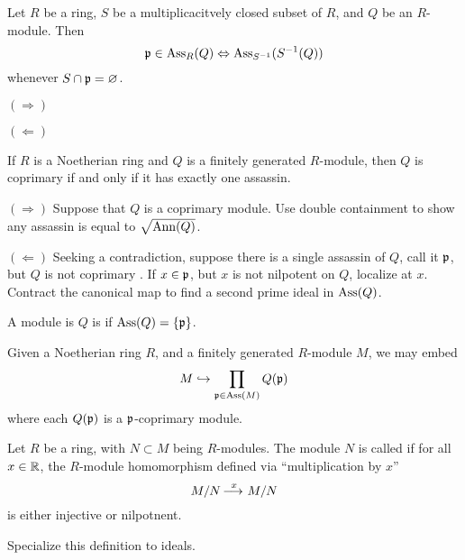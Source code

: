 \documentclass{ximera}
\begin{document}
\begin{proposition}
  Let $R$ be a ring, $S$ be a multiplicacitvely closed subset of $R$,
  and $Q$ be an $R$-module. Then
  \[
  \mathfrak{p} \in \operatorname{Ass}_R(Q) \Leftrightarrow \operatorname{Ass}_{S^{-1}}(S^{-1}(Q))
  \]
  whenever $S\cap\mathfrak{p} = \varnothing$.
  \begin{sketch}
    $(\Rightarrow)$

    $(\Leftarrow)$
  \end{sketch}
\end{proposition}


\begin{lemma}
  If $R$ is a Noetherian ring and $Q$ is a finitely generated
  $R$-module, then $Q$ is coprimary if and only if it has exactly one
  assassin.
  \begin{sketch} 
    $(\Rightarrow)$ Suppose that $Q$ is a coprimary module. Use double
    containment to show any assassin is equal to $\sqrt{\operatorname{Ann}(Q)}$.

    
    $(\Leftarrow)$ Seeking a contradiction, suppose there is a single
    assassin of $Q$, call it $\mathfrak{p}$, but $Q$ is not coprimary . If $x\in
    \mathfrak{p}$, but $x$ is not nilpotent on $Q$, localize at $x$. Contract
    the canonical map to find a second prime ideal in $\operatorname{Ass}(Q)$.
  \end{sketch}
\end{lemma}


\begin{definition}
  A module is $Q$ is  if $\operatorname{Ass}(Q) = \{\mathfrak{p}\}$.
\end{definition}


\begin{theorem}
  Given a Noetherian ring $R$, and a finitely generated $R$-module $M$, we may embed
  \[
  M\hookrightarrow \prod_{\mathfrak{p}\in\operatorname{Ass}(M)} Q(\mathfrak{p})
  \]
  where each $Q(\mathfrak{p})$ is a $\mathfrak{p}$-coprimary module.
\end{theorem}




\begin{definition}
  Let $R$ be a ring, with $N\subset M$ being $R$-modules. The module
  $N$ is called  if for all $x\in\mathbb R$, the $R$-module
  homomorphism defined via ``multiplication by $x$''
  \[
  M/N\mathop{\longrightarrow\,}\limits^{x} M/N
  \]
  is either injective or nilpotnent.
\end{definition}

\begin{exercise}
  Specialize this definition to ideals.
\end{exercise}
\end{document}
